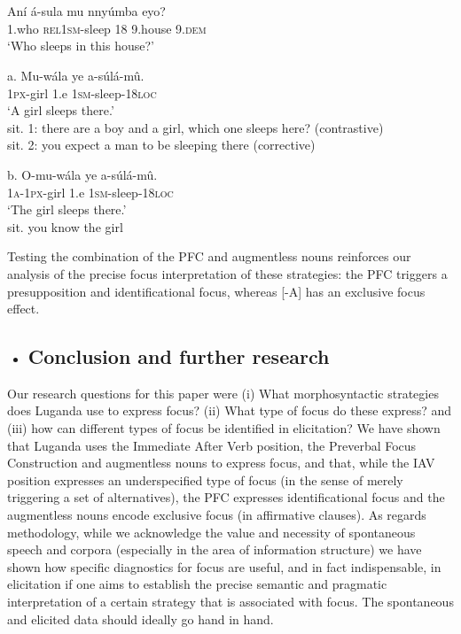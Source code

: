 \documentclass[output=paper]{langsci/langscibook}
\begin{document}
\chapter{}
\gll   Aní  á-sula      mu  nnyúmba  eyo?\\
       1.who  \textsc{rel1sm}{}-sleep  18  9.house  9.\textsc{dem}\\
\glt   ‘Who sleeps in this house?’
\z

\gll   a.  Mu-wála  ye  a-súlá-mû.\\
         \textsc{1px}{}-girl  1.e  \textsc{1sm}{}-sleep-\textsc{18loc}\\
\glt ‘A girl sleeps there.’\\
sit. 1: there are a boy and a girl, which one sleeps here? (contrastive)\\
sit. 2: you expect a man to be sleeping there (corrective)
\z

\gll   b.  O-mu-wála  ye  a-súlá-mû.\\
         \textsc{1a}{}-\textsc{1px}{}-girl  1.e  \textsc{1sm}{}-sleep-\textsc{18loc}\\
\glt ‘The girl sleeps there.’\\
sit. you know the girl
\z

Testing the combination of the PFC and augmentless nouns reinforces our analysis of the precise focus interpretation of these strategies: the PFC triggers a presupposition and identificational focus, whereas [-A] has an exclusive focus effect.

\begin{itemize}
\item \section{ \label{bkm:Ref297362499}Conclusion and further research}
\end{itemize}

Our research questions for this paper were (i) What morphosyntactic strategies does Luganda use to express focus? (ii) What type of focus do these express? and (iii) how can different types of focus be identified in elicitation? We have shown that Luganda uses the Immediate After Verb position, the Preverbal Focus Construction and augmentless nouns to express focus, and that, while the IAV position expresses an underspecified type of focus (in the sense of merely triggering a set of alternatives), the PFC expresses identificational focus and the augmentless nouns encode exclusive focus (in affirmative clauses). As regards methodology, while we acknowledge the value and necessity of spontaneous speech and corpora (especially in the area of information structure) we have shown how specific diagnostics for focus are useful, and in fact indispensable, in elicitation if one aims to establish the precise semantic and pragmatic interpretation of a certain strategy that is associated with focus. The spontaneous and elicited data should ideally go hand in hand.
\end{document}
